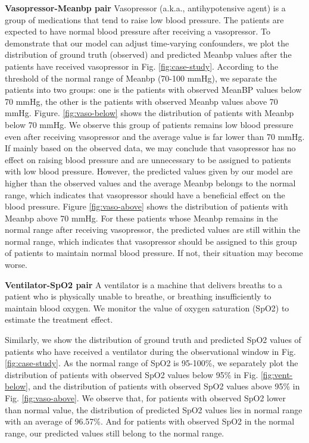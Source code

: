 \vspace{3pt}
\noindent\textbf{Vasopressor-Meanbp pair}
Vasopressor (a.k.a., antihypotensive agent) is a group of medications that tend to raise low blood pressure. The patients are expected to have normal blood pressure after receiving a vasopressor. To demonstrate that our model can adjust time-varying confounders, we plot the distribution of ground truth (observed) and predicted Meanbp values after the patients have received vasopressor in Fig. \ref{fig:case-study}. According to the threshold of the normal range of Meanbp (70-100 mmHg), we separate the patients into two groups: one is the patients with observed MeanBP values below 70 mmHg, the other is the patients with observed Meanbp values above 70 mmHg. Figure. \ref{fig:vaso-below} shows the distribution of patients with Meanbp below 70 mmHg. We observe this group of patients remains low blood pressure even after receiving vasopressor and the average value is far lower than 70 mmHg. If mainly based on the observed data, we may conclude that vasopressor has no effect on raising blood pressure and are unnecessary to be assigned to patients with low blood pressure. However, the predicted values given by our model are higher than the observed values and the average Meanbp belongs to the normal range, which indicates that vasopressor should have a beneficial effect on the blood pressure. Figure \ref{fig:vaso-above} shows the distribution of patients with Meanbp above 70 mmHg. For these patients whose Meanbp remains in the normal range after receiving vasopressor, the predicted values are still within the normal range, which indicates that vasopressor should be assigned to this group of patients to maintain normal blood pressure. If not, their situation may become worse.    

\vspace{3pt}
\noindent\textbf{Ventilator-SpO2 pair}
A ventilator is a machine that delivers breaths to a patient who is physically unable to breathe, or breathing insufficiently to maintain blood oxygen. We monitor the value of oxygen saturation (SpO2) to estimate the treatment effect. 

Similarly, we show the distribution of ground truth and predicted SpO2 values of patients who have received a ventilator during the observational window in Fig. \ref{fig:case-study}. As the normal range of SpO2 is 95-100\%, we separately plot the distribution of patients with observed SpO2 values below 95\% in Fig. \ref{fig:vent-below}, and the distribution of patients with observed SpO2 values above 95\% in Fig. \ref{fig:vaso-above}. We observe that, for patients with observed SpO2 lower than normal value, the distribution of predicted SpO2 values lies in normal range with an average of 96.57\%. And for patients with observed SpO2 in the normal range, our predicted values still belong to the normal range. 

